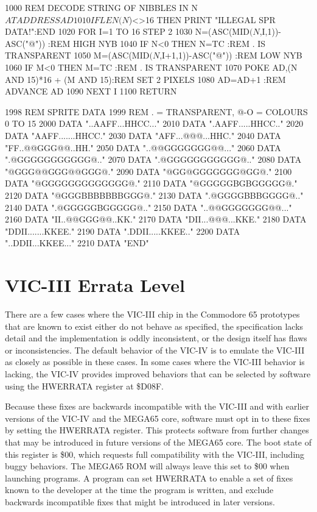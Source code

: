 \begin{screencode}
1000 REM DECODE STRING OF NIBBLES IN N$ AT ADDRESS AD
1010 IF LEN(N$)<>16 THEN PRINT "ILLEGAL SPR DATA!":END
1020 FOR I=1 TO 16 STEP 2
1030 N=(ASC(MID$(N$,I,1))-ASC("@"))    :REM HIGH NYB
1040 IF N<0 THEN N=TC                  :REM . IS TRANSPARENT
1050 M=(ASC(MID$(N$,I+1,1))-ASC("@"))  :REM LOW NYB
1060 IF M<0 THEN M=TC                  :REM . IS TRANSPARENT
1070 POKE AD,(N AND 15)*16 + (M AND 15):REM SET 2 PIXELS
1080 AD=AD+1                           :REM ADVANCE AD
1090 NEXT I
1100 RETURN

1998 REM SPRITE DATA
1999 REM . = TRANSPARENT, @-O = COLOURS 0 TO 15
2000 DATA "..AAFF...HHCC..."
2010 DATA ".AAFF.....HHCC.."
2020 DATA "AAFF.......HHCC."
2030 DATA "AFF...@@@...HHC."
2040 DATA "FF..@@GGG@@..HH."
2050 DATA "..@@GGGGGGG@@..."
2060 DATA ".@GGGGGGGGGGG@.."
2070 DATA ".@GGGGGGGGGGG@.."
2080 DATA "@GGG@@GGG@@GGG@."
2090 DATA "@GG@GGGGGGG@GG@."
2100 DATA "@GGGGGGGGGGGGG@."
2110 DATA "@GGGGGBGBGGGGG@."
2120 DATA "@GGGBBBBBBBGGG@."
2130 DATA ".@GGGGBBBGGGG@.."
2140 DATA ".@GGGGGBGGGGG@.."
2150 DATA "..@@GGGGGGG@@..."
2160 DATA "II..@@GGG@@..KK."
2170 DATA "DII...@@@...KKE."
2180 DATA "DDII.......KKEE."
2190 DATA ".DDII.....KKEE.."
2200 DATA "..DDII...KKEE..."
2210 DATA "END"
\end{screencode}
\clearpage

\section{VIC-III Errata Level}

There are a few cases where the VIC-III chip in the Commodore 65 prototypes that are known to exist either do not behave as specified, the specification lacks detail and the implementation is oddly inconsistent, or the design itself has flaws or inconsistencies. The default behavior of the VIC-IV is to emulate the VIC-III as closely as possible in these cases. In some cases where the VIC-III behavior is lacking, the VIC-IV provides improved behaviors that can be selected by software using the HWERRATA register at \$D08F.

Because these fixes are backwards incompatible with the VIC-III and with earlier versions of the VIC-IV and the MEGA65 core, software must opt in to these fixes by setting the HWERRATA register. This protects software from further changes that may be introduced in future versions of the MEGA65 core. The boot state of this register is \$00, which requests full compatibility with the VIC-III, including buggy behaviors. The MEGA65 ROM will always leave this set to \$00 when launching programs. A program can set HWERRATA to enable a set of fixes known to the developer at the time the program is written, and exclude backwards incompatible fixes that might be introduced in later versions.


